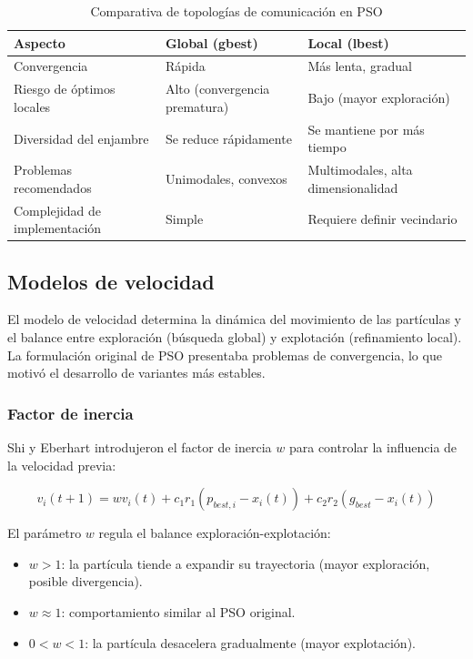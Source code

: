 \begin{table}[H]
  \centering
  \caption{Comparativa de topologías de comunicación en PSO}
  \label{tab:topologias-pso}
  \begin{tabularx}{\textwidth}{lXX}
    \toprule
    \textbf{Aspecto} & \textbf{Global (gbest)} & \textbf{Local (lbest)} \\
    \midrule
    Convergencia &
    Rápida &
    Más lenta, gradual \\
    \addlinespace
    Riesgo de óptimos locales &
    Alto (convergencia prematura) &
    Bajo (mayor exploración) \\
    \addlinespace
    Diversidad del enjambre &
    Se reduce rápidamente &
    Se mantiene por más tiempo \\
    \addlinespace
    Problemas recomendados &
    Unimodales, convexos &
    Multimodales, alta dimensionalidad \\
    \addlinespace
    Complejidad de implementación &
    Simple &
    Requiere definir vecindario \\
    \bottomrule
  \end{tabularx}
\end{table}

\subsection{Modelos de velocidad}

El modelo de velocidad determina la dinámica del movimiento de las
partículas y el balance entre exploración (búsqueda global) y
explotación (refinamiento local). La formulación original de PSO
presentaba problemas de convergencia, lo que motivó el desarrollo de
variantes más estables.

\subsubsection{Factor de inercia}

Shi y Eberhart introdujeron el factor de inercia $w$ para controlar
la influencia de la velocidad previa:

\begin{equation}
  v_i(t+1) = w v_i(t) + c_1 r_1 (p_{best,i} - x_i(t)) + c_2 r_2
  (g_{best} - x_i(t))
\end{equation}

El parámetro $w$ regula el balance exploración-explotación:
\begin{itemize}
  \item $w > 1$: la partícula tiende a expandir su trayectoria
    (mayor exploración, posible divergencia).
  \item $w \approx 1$: comportamiento similar al PSO original.
  \item $0 < w < 1$: la partícula desacelera gradualmente
    (mayor explotación).
\end{itemize}

